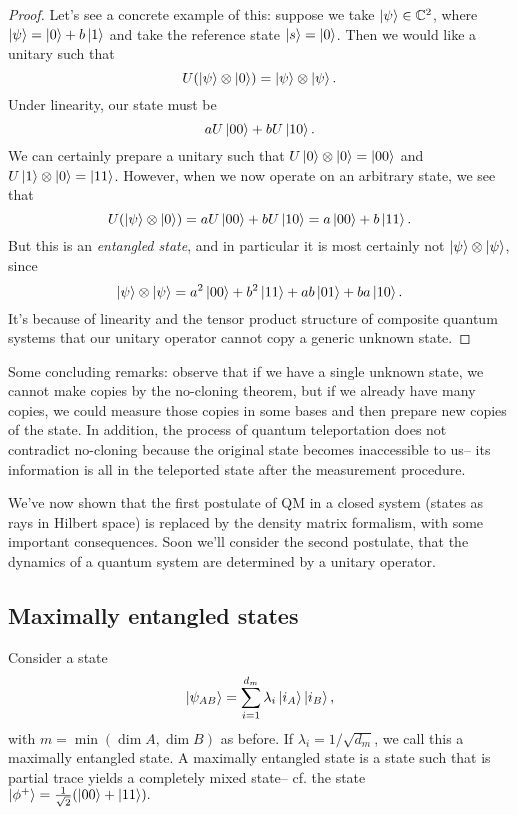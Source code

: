 \begin{proof}
    Let's see a concrete example of this: suppose we take $\left| \psi \right>\in \mathbb{C}^2$, where $\left| \psi \right>= \left| 0 \right> + b\left| 1 \right>$ and take the reference state $\left| s \right>=\left| 0 \right>$. Then we would like a unitary such that
    \begin{equation}
        U(\left| \psi \right>\otimes \left| 0 \right>)=\left| \psi \right>\otimes \left| \psi \right>.
    \end{equation}
    Under linearity, our state must be
    \begin{equation}
        a U\left| 00 \right>+b U\left| 10 \right>.
    \end{equation}
    We can certainly prepare a unitary such that $U\left| 0 \right>\otimes \left| 0 \right>=\left| 00 \right>$ and $U\left| 1 \right>\otimes \left| 0 \right>=\left| 11 \right>$. However, when we now operate on an arbitrary state, we see that
    \begin{equation}
        U(\left| \psi \right>\otimes \left| 0 \right>)=aU \left| 00 \right>+b U\left| 10 \right> = a\left| 00 \right> +b\left| 11 \right>.
    \end{equation}
    But this is an \emph{entangled state}, and in particular it is most certainly not $\left| \psi \right>\otimes \left| \psi \right>$, since
    \begin{equation}
        \left| \psi \right>\otimes \left| \psi \right> =a^2 \left| 00 \right> + b^2 \left| 11 \right> + ab\left| 01 \right> +ba \left| 10 \right>.
    \end{equation}
    It's because of linearity and the tensor product structure of composite quantum systems that our unitary operator cannot copy a generic unknown state.
\end{proof}

Some concluding remarks: observe that if we have a single unknown state, we cannot make copies by the no-cloning theorem, but if we already have many copies, we could measure those copies in some bases and then prepare new copies of the state. In addition, the process of quantum teleportation does not contradict no-cloning because the original state becomes inaccessible to us-- its information is all in the teleported state after the measurement procedure.

We've now shown that the first postulate of QM in a closed system (states as rays in Hilbert space) is replaced by the density matrix formalism, with some important consequences. Soon we'll consider the second postulate, that the dynamics of a quantum system are determined by a unitary operator.

\subsection*{Maximally entangled states} Consider a state
\begin{equation}
    \left| \psi_{AB} \right>=\sum_{i=1}^{d_m} \lambda_i \left| i_A \right> \left| i_B \right>,
\end{equation}
with $m=\min(\dim A,\dim B)$ as before. If $\lambda_i=1/\sqrt{d_m}$, we call this a maximally entangled state. A maximally entangled state is a state such that is partial trace yields a completely mixed state-- cf. the state $\left| \phi^+ \right>=\frac{1}{\sqrt{2}}(\left| 00 \right>+\left| 11 \right>).$
